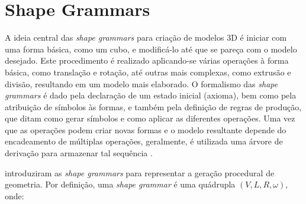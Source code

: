 \begin{figure}[h!]
	\centering
	\captionsetup{width=15cm}
	{}	
\end{figure}

\section{Shape Grammars}
\label{sec:shape_grammars}

A ideia central das \textit{shape grammars} para criação de modelos 3D é iniciar com uma forma básica, como um cubo, e modificá-lo até que se pareça com o modelo desejado. Este procedimento é realizado aplicando-se várias operações à forma básica, como translação e rotação, até outras mais complexas, como extrusão e divisão, resultando em um modelo mais elaborado. O formalismo das \textit{shape grammars} é dado pela declaração de um estado inicial (axioma), bem como pela atribuição de  símbolos às formas, e também pela definição de regras de produção, que ditam como gerar símbolos e como aplicar as diferentes operações. Uma vez que as operações podem criar novas formas e o modelo resultante depende do encadeamento de múltiplas operações, geralmente, é utilizada uma árvore de derivação para armazenar tal sequência \cite{haubenwallner2016}.

 introduziram as \textit{shape grammars} para representar a geração procedural de geometria. Por definição, uma \textit{shape grammar} é uma quádrupla $(V, L, R, \omega)$, onde:

